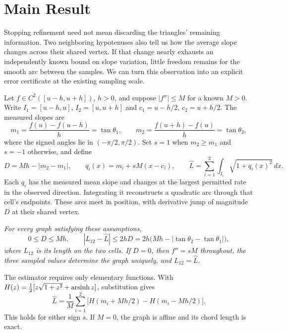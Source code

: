 \section{Main Result}
Stopping refinement need not mean discarding the triangles' remaining
information. Two neighboring hypotenuses also tell us how the average
slope changes across their shared vertex. If that change nearly exhausts
an independently known bound on slope variation, little freedom remains
for the smooth arc between the samples. We can turn this observation into
an explicit error certificate at the existing sampling scale.

Let $f\in C^2([u-h,u+h])$, $h>0$, and suppose $|f''|\le M$ for a
known $M>0$. Write $I_1=[u-h,u]$, $I_2=[u,u+h]$ and
$c_1=u-h/2$, $c_2=u+h/2$. The measured slopes are
\begin{equation}
 m_1=\frac{f(u)-f(u-h)}h=\tan\theta_1,\qquad
 m_2=\frac{f(u+h)-f(u)}h=\tan\theta_2,
\end{equation}
where the signed angles lie in $(-\pi/2,\pi/2)$. Set $s=1$ when
$m_2\ge m_1$ and $s=-1$ otherwise, and define
\begin{equation}\label{eq:deficit}
 D=Mh-|m_2-m_1|,\qquad q_i(x)=m_i+sM(x-c_i),\qquad
 \widehat L=\sum_{i=1}^2\int_{I_i}\sqrt{1+q_i(x)^2}\,dx.
\end{equation}
Each $q_i$ has the measured mean slope and changes at the largest
permitted rate in the observed direction. Integrating it reconstructs
a quadratic arc through that cell's endpoints. These arcs meet in
position, with derivative jump of magnitude $D$ at their shared vertex.

\noindent\textit{For every graph satisfying these assumptions,}
\begin{equation}\label{eq:main}
 \boxed{0\le D\le Mh,\qquad
 |L_{12}-\widehat L|\le2hD
 =2h\bigl(Mh-|\tan\theta_2-\tan\theta_1|\bigr),}
\end{equation}
\textit{where $L_{12}$ is its length on the two cells. If $D=0$, then
$f''=sM$ throughout, the three sampled values determine the graph
uniquely, and $L_{12}=\widehat L$.}

The estimator requires only elementary functions. With
$H(z)=\tfrac12[z\sqrt{1+z^2}+\operatorname{arsinh} z]$, substitution gives
\begin{equation}\label{eq:evaluation}
 \widehat L=\frac1M\sum_{i=1}^2
 \bigl[H(m_i+Mh/2)-H(m_i-Mh/2)\bigr].
\end{equation}
This holds for either sign $s$. If $M=0$, the graph is affine and its
chord length is exact.

